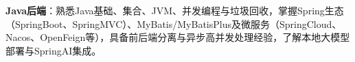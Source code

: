 \item \textbf{Java后端}：熟悉Java基础、集合、JVM、并发编程与垃圾回收，掌握Spring生态（SpringBoot、SpringMVC）、MyBatis/MyBatisPlus及微服务（SpringCloud、Nacos、OpenFeign等），具备前后端分离与异步高并发处理经验，了解本地大模型部署与SpringAI集成。